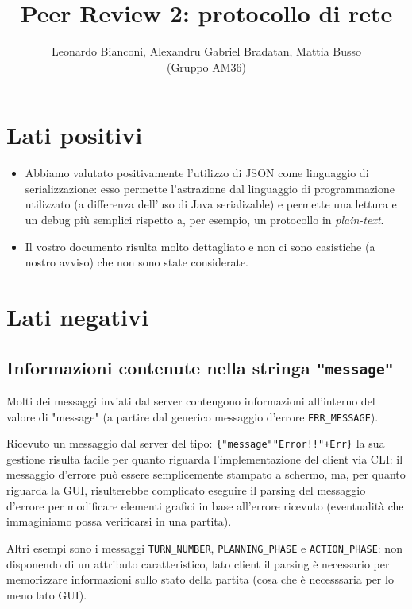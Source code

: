 \documentclass{article}
\title{Peer Review 2: protocollo di rete}
\author{Leonardo Bianconi, Alexandru Gabriel Bradatan, Mattia Busso \\(Gruppo AM36)}
\begin{document}
    \maketitle

    \section{Lati positivi}
        \begin{itemize}
            \item Abbiamo valutato positivamente l'utilizzo di JSON come linguaggio
                di serializzazione: esso permette l'astrazione dal linguaggio di 
                programmazione utilizzato (a differenza dell'uso di Java serializable)
                e permette una lettura e un debug più semplici rispetto a, per esempio,
                un protocollo in \textit{plain-text}.
            \item Il vostro documento risulta molto dettagliato e non ci sono casistiche
                (a nostro avviso) che non sono state considerate. 
        \end{itemize}

    \section{Lati negativi}
        \subsection{Informazioni contenute nella stringa \texttt{"message"}}
            Molti dei messaggi inviati dal server contengono informazioni
            all'interno del valore di "message" (a partire dal
            generico messaggio d'errore \texttt{ERR\_MESSAGE}).
            
            Ricevuto un messaggio dal server del tipo:
            \texttt{\{"message"\="Error!!"+Err\}} la sua gestione
            risulta facile per quanto riguarda l'implementazione del client via
            CLI: il messaggio d'errore può essere semplicemente stampato a schermo,
            ma, per quanto riguarda la GUI, risulterebbe complicato eseguire il
            parsing del messaggio d'errore per modificare elementi grafici in base
            all'errore ricevuto (eventualità che immaginiamo possa verificarsi
            in una partita).    %

            Altri esempi sono i messaggi \texttt{TURN\_NUMBER}, \texttt{PLANNING\_PHASE} e
            \texttt{ACTION\_PHASE}: non disponendo di un attributo caratteristico, lato
            client il parsing è necessario per memorizzare informazioni sullo stato
            della partita (cosa che è necesssaria per lo meno lato GUI).
\end{document}
